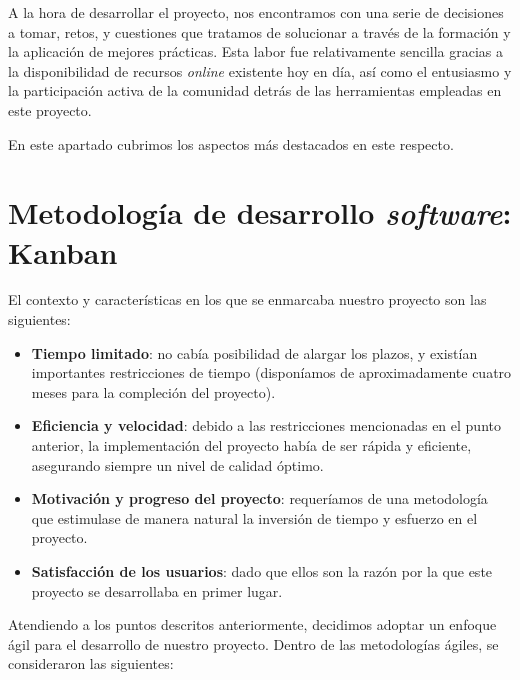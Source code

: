 
A la hora de desarrollar el proyecto, nos encontramos con una serie de decisiones a tomar, retos, y cuestiones que tratamos de solucionar a través de la formación y la aplicación de mejores prácticas. Esta labor fue relativamente sencilla gracias a la disponibilidad de recursos \emph{online} existente hoy en día, así como el entusiasmo y la participación activa de la comunidad detrás de las herramientas empleadas en este proyecto.

En este apartado cubrimos los aspectos más destacados en este respecto.

\section{Metodología de desarrollo \emph{software}: Kanban}

El contexto y características en los que se enmarcaba nuestro proyecto son las siguientes:

\vspace{-0.5cm}
\begin{itemize}
	\item [\textbullet] \textbf{Tiempo limitado}: no cabía posibilidad de alargar los plazos, y existían importantes restricciones de tiempo (disponíamos de aproximadamente cuatro meses para la compleción del proyecto).
	\item [\textbullet] \textbf{Eficiencia y velocidad}: debido a las restricciones mencionadas en el punto anterior, la implementación del proyecto había de ser rápida y eficiente, asegurando siempre un nivel de calidad óptimo.
	\item [\textbullet] \textbf{Motivación y progreso del proyecto}: requeríamos de una metodología que estimulase de manera natural la inversión de tiempo y esfuerzo en el proyecto.
	\item [\textbullet] \textbf{Satisfacción de los usuarios}: dado que ellos son la razón por la que este proyecto se desarrollaba en primer lugar.
\end{itemize}

Atendiendo a los puntos descritos anteriormente, decidimos adoptar un enfoque ágil para el desarrollo de nuestro proyecto. Dentro de las metodologías ágiles, se consideraron las siguientes:

